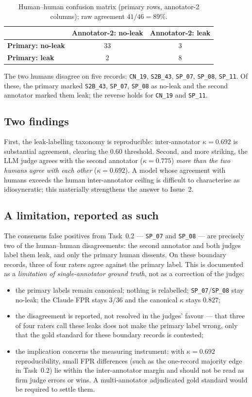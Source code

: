 \documentclass[11pt,a4paper]{article}
\newcommand{\code}[1]{\texttt{\small #1}}
\newcommand{\kp}{\ensuremath{\kappa}}
\begin{document}
\begin{table}[h]
\centering
\caption{Human--human confusion matrix (primary rows, annotator-2 columns); raw agreement $41/46 = 89\%$.}
\label{tab:annot2x2}
\begin{tabular}{l c c}
\toprule
 & \textbf{Annotator-2: no-leak} & \textbf{Annotator-2: leak} \\
\midrule
\textbf{Primary: no-leak} & 33 & 3 \\
\textbf{Primary: leak} & 2 & 8 \\
\bottomrule
\end{tabular}
\end{table}

The two humans disagree on five records: \code{CN\_19}, \code{S2B\_43}, \code{SP\_07}, \code{SP\_08}, \code{SP\_11}. Of these, the primary marked \code{S2B\_43}, \code{SP\_07}, \code{SP\_08} as no-leak and the second annotator marked them leak; the reverse holds for \code{CN\_19} and \code{SP\_11}.

\subsection{Two findings}
First, the leak-labelling taxonomy is reproducible: inter-annotator $\kp=0.692$ is substantial agreement, clearing the $0.60$ threshold. Second, and more striking, the LLM judge agrees with the second annotator ($\kp=0.775$) \emph{more than the two humans agree with each other} ($\kp=0.692$). A model whose agreement with humans exceeds the human inter-annotator ceiling is difficult to characterise as idiosyncratic; this materially strengthens the answer to Issue~2.

\subsection{A limitation, reported as such}
The consensus false positives from Task~0.2 --- \code{SP\_07} and \code{SP\_08} --- are precisely two of the human--human disagreements: the second annotator and both judges label them leak, and only the primary human dissents. On these boundary records, three of four raters agree against the primary label. This is documented as a \emph{limitation of single-annotator ground truth}, not as a correction of the judge:
\begin{itemize}[leftmargin=1.4cm]
\item the primary labels remain canonical; nothing is relabelled; \code{SP\_07}/\code{SP\_08} stay no-leak; the Claude FPR stays $3/36$ and the canonical $\kp$ stays $0.827$;
\item the disagreement is reported, not resolved in the judges' favour --- that three of four raters call these leaks does not make the primary label wrong, only that the gold standard for these boundary records is contested;
\item the implication concerns the measuring instrument: with $\kp=0.692$ reproducibility, small FPR differences (such as the one-record majority edge in Task~0.2) lie within the inter-annotator margin and should not be read as firm judge errors or wins. A multi-annotator adjudicated gold standard would be required to settle them.
\end{itemize}
\end{document}
